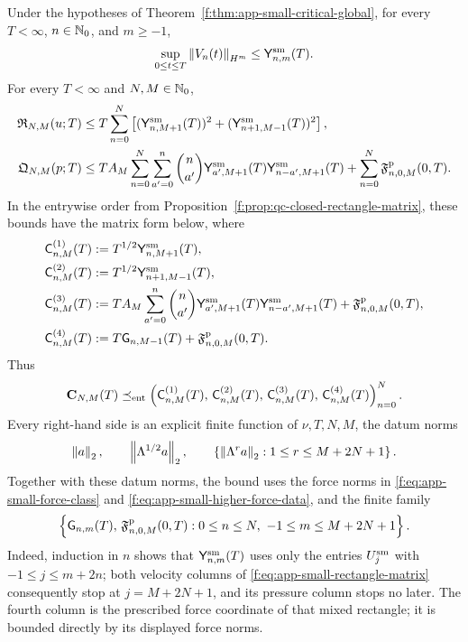 \begin{proposition}
\label{f:prop:app-small-data-rectangles}
Under the hypotheses of Theorem~\ref{f:thm:app-small-critical-global}, for
every \(T<\infty\), \(n\in\mathbb N_0\), and \(m\ge-1\),
\begin{equation}
 \sup_{0\le t\le T}\left\lVert V_n(t)\right\rVert_{H^m}
 \le\mathsf Y_{n,m}^{\rm sm}(T).
 \label{f:eq:app-small-time-row}
\end{equation}
For every \(T<\infty\) and \(N,M\in\mathbb N_0\),
\begin{align}
 \mathfrak R_{N,M}(u;T)
 &\le
 T\sum_{n=0}^{N}
 \left[
 (\mathsf Y_{n,M+1}^{\rm sm}(T))^2
 +(\mathsf Y_{n+1,M-1}^{\rm sm}(T))^2
 \right],
 \label{f:eq:app-small-rectangle}\\
 \mathfrak Q_{N,M}(p;T)
 &\le
 TA_M\sum_{n=0}^{N}\sum_{a'=0}^{n}\binom n{a'}
 \mathsf Y_{a',M+1}^{\rm sm}(T)
 \mathsf Y_{n-a',M+1}^{\rm sm}(T)
 +\sum_{n=0}^{N}\mathfrak F^{\rm p}_{n,0,M}(0,T).
 \label{f:eq:app-small-pressure-rectangle}
\end{align}
In the entrywise order from
Proposition~\ref{f:prop:qc-closed-rectangle-matrix}, these bounds have the
matrix form below, where
\begin{align*}
 \mathsf C^{(1)}_{n,M}(T)
 &:=T^{1/2}\mathsf Y_{n,M+1}^{\rm sm}(T),\\
 \mathsf C^{(2)}_{n,M}(T)
 &:=T^{1/2}\mathsf Y_{n+1,M-1}^{\rm sm}(T),\\
 \mathsf C^{(3)}_{n,M}(T)
 &:=TA_M\sum_{a'=0}^{n}\binom n{a'}
    \mathsf Y_{a',M+1}^{\rm sm}(T)
    \mathsf Y_{n-a',M+1}^{\rm sm}(T)
    +\mathfrak F^{\rm p}_{n,0,M}(0,T),\\
 \mathsf C^{(4)}_{n,M}(T)
 &:=T\mathsf G_{n,M-1}(T)
    +\mathfrak F^{\rm p}_{n,0,M}(0,T).
\end{align*}
Thus
\begin{equation}
 \mathbf C_{N,M}(T)
 \preceq_{\rm ent}
 \left(
 \mathsf C^{(1)}_{n,M}(T),\,
 \mathsf C^{(2)}_{n,M}(T),\,
 \mathsf C^{(3)}_{n,M}(T),\,
 \mathsf C^{(4)}_{n,M}(T)
 \right)_{n=0}^{N}.
 \label{f:eq:app-small-rectangle-matrix}
\end{equation}
Every right-hand side is an explicit finite function of \(\nu,T,N,M\), the
datum norms
\begin{equation}
 \left\lVert a\right\rVert_2,\qquad
 \left\lVert \Lambda^{1/2}a\right\rVert_2,\qquad
 \left\{\left\lVert \Lambda^ra\right\rVert_2:
 1\le r\le M+2N+1\right\}.
 \label{f:eq:app-small-data-derivative-ceiling}
\end{equation}
Together with these datum norms, the bound uses
the force norms in \eqref{f:eq:app-small-force-class} and
\eqref{f:eq:app-small-higher-force-data}, and the finite family
\[
 \left\{\mathsf G_{n,m}(T),\,
 \mathfrak F^{\rm p}_{n,0,M}(0,T):
 0\le n\le N,\ -1\le m\le M+2N+1\right\}.
\]
Indeed, induction in \(n\) shows that
\(\mathsf Y_{n,m}^{\rm sm}(T)\) uses only the entries
\(U_j^{\rm sm}\) with \(-1\le j\le m+2n\); both velocity columns of
\eqref{f:eq:app-small-rectangle-matrix} consequently stop at
\(j=M+2N+1\), and its pressure column stops no later.
The fourth column is the prescribed force coordinate of that mixed
rectangle; it is bounded directly by its displayed force norms.
\end{proposition}

